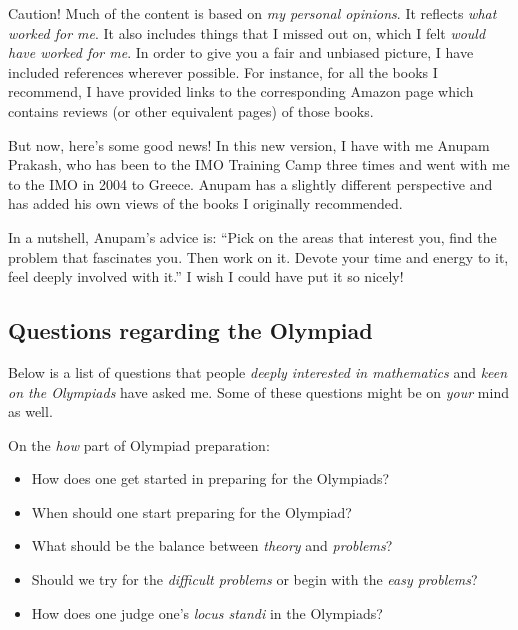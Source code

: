 \documentclass[a4paper]{amsart}
\begin{document}
Caution! Much of the content is based on {\em my personal opinions}.
It reflects {\em what worked for me}. It also includes things that I
missed out on, which I felt {\em would have worked for me}.  In order
to give you a fair and unbiased picture, I have included references
wherever possible. For instance, for all the books I recommend, I have
provided links to the corresponding Amazon page which contains reviews (or other equivalent pages)
of those books.

But now, here's some good news! In this new version, I have with me Anupam Prakash, who has been to the IMO Training Camp three times
and went with me to the IMO in 2004 to Greece. Anupam has a slightly different perspective and has added his own views of the books
I originally recommended.

In a nutshell, Anupam's advice is: ``Pick on the areas that interest you, find the problem that fascinates you. Then work on it.
Devote your time and energy to it, feel deeply involved with it.'' I wish I could have put it so nicely!

\subsection{Questions regarding the Olympiad}

Below is a list of questions that people {\em deeply interested in mathematics} and {\em keen on the Olympiads}
have asked me. Some of these questions might be on {\em your} mind as well.

On the {\em how} part of Olympiad preparation:

\begin{itemize}

\item How does one get started in preparing for the Olympiads?

\item When should one start preparing for the Olympiad?

\item What should be the balance between {\em theory} and {\em problems}?

\item Should we try for the {\em difficult problems} or begin with the {\em easy problems}?

\item How does one judge one's {\em locus standi} in the Olympiads?

\end{itemize}
\end{document}
